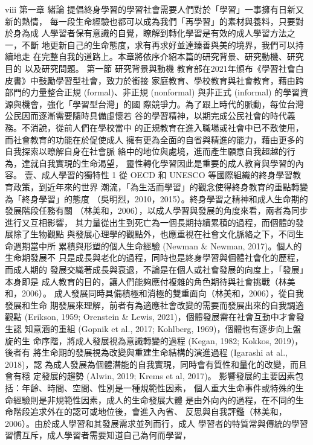   
viii 
第一章 緒論 
提倡終身學習的學習社會需要人們對於「學習」一事擁有日新又新的熱情，
每一段生命經驗也都可以成為我們「再學習」的素材與養料，只要對於身為成
人學習者保有意識的自覺，瞭解到轉化學習是有效的成人學習方法之一，不斷
地更新自己的生命態度，求有再求好並達臻善與美的境界，我們可以持續地走
在完整自我的道路上。本章將依序介紹本篇的研究背景、研究動機、研究目的
以及研究問題。 
第一節 研究背景與動機 
教育部在2021年頒布《學習社會白皮書》中鼓勵學習型社會，致力於銜接
家庭教育、學校教育與社會教育，藉由跨部門的力量整合正規 (formal)、非正規 
(nonformal) 與非正式 (informal) 的學習資源與機會，強化「學習型台灣」的國
際競爭力。為了跟上時代的脈動，每位台灣公民因而逐漸需要隨時具備虛懷若
谷的學習精神，以期完成公民社會的時代義務。不消說，從前人們在學校當中
的正規教育在進入職場或社會中已不敷使用，而社會教育的功能在於促使成人
擁有更為全面的自省與精進的能力，藉由更多的自我探索以瞭解自身在社會脈
絡中的地位與處境，進而產生願意自我超越的行為，達就自我實現的生命渴望，
靈性轉化學習因此是重要的成人教育與學習的內容。 
壹、成人學習的獨特性 
1 
從 OECD 和 UNESCO 等國際組織的終身學習教育政策，到近年來的世界
潮流，「為生活而學習」的觀念使得終身教育的重點轉變為「終身學習」的態度
（吳明烈，2010，2015）。終身學習之精神和成人生命期的發展階段任務有關
（林美和，2006），以成人學習與發展的角度來看，兩者為同步進行又互相影響，
其力量從出生到死亡為一個長期持續累積的過程，而個體的發展除了生物觀點
與發展心理學的觀點外，也應重視在社會文化脈絡之下，不同生命週期當中所
累積與形塑的個人生命經驗 (Newman & Newman, 2017)。個人的生命期發展不
只是成長與老化的過程，同時也是終身學習與個體社會化的歷程，而成人期的
發展交織著成長與衰退，不論是在個人或社會發展的向度上，「發展」本身即是
成人教育的目的，讓人們能夠應付複雜的角色期待與社會挑戰（林美和，2006）。
成人發展同時具備積極和消極的雙重面向（林美和，2006），從自我發展和生命
期發展來理解，前者有為適應社會改變的需要而發展出來的自我調適觀點 
(Erikson, 1959; Orenstein & Lewis, 2021)，個體發展需在社會互動中才會發生認
知意涵的重組 (Gopnik et al., 2017; Kohlberg, 1969)，個體也有逐步向上盤旋的生
命序階，將成人發展視為意識轉變的過程 (Kegan, 1982; Kokkos, 2019)，後者有
將生命期的發展視為改變與重建生命結構的演進過程 (Igarashi at al., 2018)，認
為成人發展為個體潛能的自我實現，同時會有質性和量化的改變，而且會有穩
定發展的趨勢 (Alwin, 2019; Krems et al, 2017)。 
影響發展的主要因素包括：年齡、時間、空間、性別是一種規範性因素，
個人重大生命事件或特殊的生命經驗則是非規範性因素，成人的生命發展大體
是由外向內的過程，在不同的生命階段追求外在的認可或地位後，會進入內省、
反思與自我評鑑（林美和，2006）。由於成人學習和其發展需求並列而行，成人
學習者的特質常與傳統的學習習慣互斥，成人學習者需要知道自己為何而學習，
